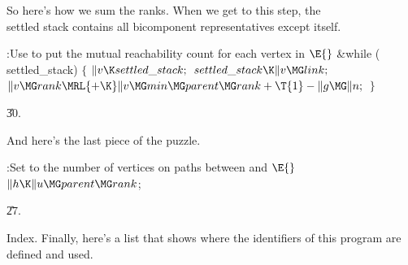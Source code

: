 So here's how we sum the ranks. When we get to this step, the \\{settled}
stack contains all bicomponent representatives except  itself.

\Y\B\4:Use  to put the mutual reachability count for
each vertex  in \X${}\E{}$\6
\&{while} (\\{settled\_stack})\5
${}\{{}$\1\6
${}\|v\K\\{settled\_stack};{}$\6
${}\\{settled\_stack}\K\|v\MG\\{link};{}$\6
${}\|v\MG\\{rank}\MRL{+{\K}}\|v\MG\\{min}\MG\\{parent}\MG\\{rank}+\T{1}-\|g\MG%
\|n;{}$\6
\4${}\}{}$\2\par
\U30.\fi

And here's the last piece of the puzzle.

\Y\B\4:Set  to the number of vertices on paths between  and
\X${}\E{}$\6
$\|h\K\|u\MG\\{parent}\MG\\{rank}{}$;\par
\U27.\fi

Index. Finally, here's a list that shows where the identifiers of this
program are defined and used.

\fi


\inx
\fin
\con
